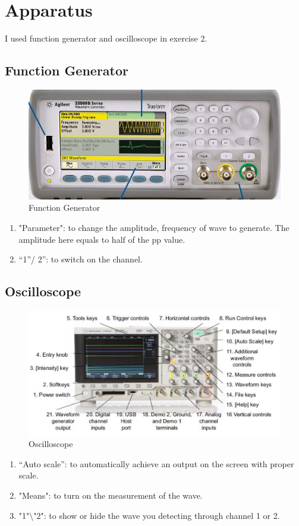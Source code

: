 \documentclass[12pt]{article}
\begin{document}
\section{Apparatus}
I used function generator and oscilloscope in exercise 2.
\subsection{Function Generator}
\begin{figure}[H]
\centering
\includegraphics[scale=0.3]{P5.jpg}
\caption{Function Generator}
\end{figure}
\begin{enumerate}
\item "Parameter": to change the amplitude, frequency of wave to generate. The amplitude here equals to half of the pp value.
\item “1”/ 2”: to switch on the channel.
\end{enumerate}
\subsection{Oscilloscope}
\begin{figure}[H]
\centering
\includegraphics[scale=0.3]{P6.jpg}
\caption{Oscilloscope}
\end{figure}
\begin{enumerate}
\item “Auto scale”: to automatically achieve an output on the screen with proper scale.
\item "Means": to turn on the measurement of the wave.
\item "1"$\setminus$"2": to show or hide the wave you detecting through channel 1 or 2.
\end{enumerate}
\end{document}
